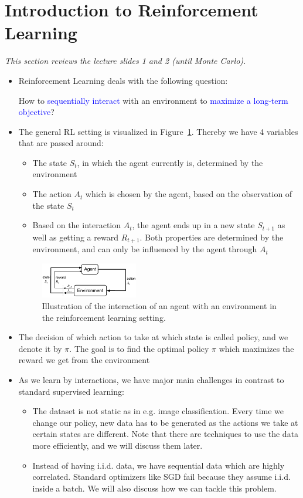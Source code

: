 \section{Introduction to Reinforcement Learning}
\textit{This section reviews the lecture slides 1 and 2 (until Monte Carlo). }
\begin{itemize}
	\item Reinforcement Learning deals with the following question: 
	
	How to \textcolor{blue}{sequentially interact} with an environment to \textcolor{blue}{maximize a long-term objective}?
	
	\item The general RL setting is visualized in Figure~\ref{fig:rl_introduction_reinforcement_learning}. Thereby we have 4 variables that are passed around:
	\begin{itemize}
		\item The state $S_t$, in which the agent currently is, determined by the environment
		\item The action $A_t$ which is chosen by the agent, based on the observation of the state $S_t$
		\item Based on the interaction $A_t$, the agent ends up in a new state $S_{t+1}$ as well as getting a reward $R_{t+1}$. Both properties are determined by the environment, and can only be influenced by the agent through $A_t$
	\end{itemize}
	\begin{figure}[ht!]
		\centering
		\includegraphics[width=0.4\textwidth]{figures/rl_introduction_reinforcement_learning.pdf}
		\caption{Illustration of the interaction of an agent with an environment in the reinforcement learning setting.}
		\label{fig:rl_introduction_reinforcement_learning}
	\end{figure}

	\item The decision of which action to take at which state is called policy, and we denote it by $\pi$. The goal is to find the optimal policy $\pi$ which maximizes the reward we get from the environment
		
	\item As we learn by interactions, we have major main challenges in contrast to standard supervised learning:
	\begin{itemize}
		\item The dataset is not static as in e.g. image classification. Every time we change our policy, new data has to be generated as the actions we take at certain states are different. Note that there are techniques to use the data more efficiently, and we will discuss them later.  
		\item Instead of having i.i.d. data, we have sequential data which are highly correlated. Standard optimizers like SGD fail because they assume i.i.d. inside a batch. We will also discuss how we can tackle this problem.
	\end{itemize}
\end{itemize}
